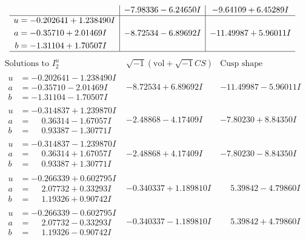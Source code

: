 \documentclass[1p]{elsarticle_modified}
\theoremstyle{definition}
\newcommand{\I}{\sqrt{-1}}
\begin{document}
$$\begin{array}{c|c|c}
 & -7.98336 - 6.24650 I & -9.64109 + 6.45289 I \\ \hline\begin{aligned}
u &= -0.202641 + 1.238490 I \\
a &= -0.35710 + 2.01469 I \\
b &= -1.31104 + 1.70507 I\end{aligned}
 & -8.72534 - 6.89692 I & -11.49987 + 5.96011 I\\
 \hline 
 \end{array}$$\newpage$$\begin{array}{c|c|c}  
\text{Solutions to }I^u_{2}& \I (\text{vol} + \sqrt{-1}CS) & \text{Cusp shape}\\
 \hline 
\begin{aligned}
u &= -0.202641 - 1.238490 I \\
a &= -0.35710 - 2.01469 I \\
b &= -1.31104 - 1.70507 I\end{aligned}
 & -8.72534 + 6.89692 I & -11.49987 - 5.96011 I \\ \hline\begin{aligned}
u &= -0.314837 + 1.239870 I \\
a &= \phantom{-}0.36314 - 1.67057 I \\
b &= \phantom{-}0.93387 - 1.30771 I\end{aligned}
 & -2.48868 - 4.17409 I & -7.80230 + 8.84350 I \\ \hline\begin{aligned}
u &= -0.314837 - 1.239870 I \\
a &= \phantom{-}0.36314 + 1.67057 I \\
b &= \phantom{-}0.93387 + 1.30771 I\end{aligned}
 & -2.48868 + 4.17409 I & -7.80230 - 8.84350 I \\ \hline\begin{aligned}
u &= -0.266339 + 0.602795 I \\
a &= \phantom{-}2.07732 + 0.33293 I \\
b &= \phantom{-}1.19326 + 0.90742 I\end{aligned}
 & -0.340337 + 1.189810 I & \phantom{-}5.39842 - 4.79860 I \\ \hline\begin{aligned}
u &= -0.266339 - 0.602795 I \\
a &= \phantom{-}2.07732 - 0.33293 I \\
b &= \phantom{-}1.19326 - 0.90742 I\end{aligned}
 & -0.340337 - 1.189810 I & \phantom{-}5.39842 + 4.79860 I \\ \hline\begin{aligned}

\end{aligned}
\end{array}$$
\end{document}

